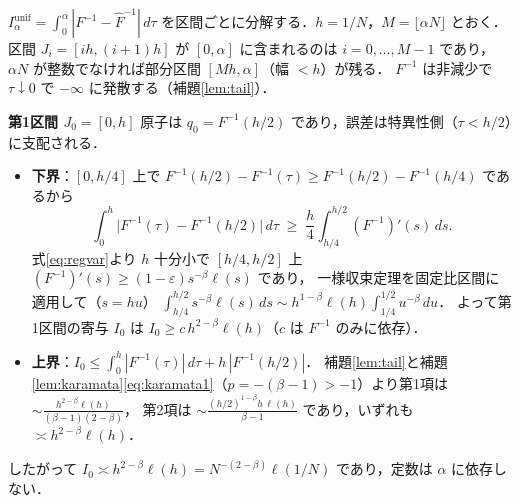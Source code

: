 \documentclass[a4paper,10pt]{jsarticle}
\makeatletter
\theoremstyle{definition}
\renewenvironment{proof}[1][\proofname]{\par
  \pushQED{\qed}%
  \normalfont \topsep6\p@\@plus6\p@\relax
  \trivlist
  \item[\hskip\labelsep\textbf{#1}]\ignorespaces
}{%
  \popQED\endtrivlist\@endpefalse
}
\renewcommand{\proofname}{証明}
\newcommand{\Finv}{F^{-1}}
\newcommand{\Fhinv}{\hat{F}^{-1}}
\newcommand{\Iunif}{I_\alpha^{\mathrm{unif}}}
\makeatother
\begin{document}
\begin{proof}
$\Iunif=\int_0^\alpha|\Finv-\Fhinv|\,d\tau$ を区間ごとに分解する．$h=1/N$，$M=\lfloor\alpha N\rfloor$ とおく．
区間 $J_i=[ih,(i+1)h]$ が $[0,\alpha]$ に含まれるのは $i=0,\dots,M-1$ であり，$\alpha N$ が整数でなければ部分区間 $[Mh,\alpha]$（幅 $<h$）が残る．
$\Finv$ は非減少で $\tau\downarrow0$ で $-\infty$ に発散する（補題\ref{lem:tail}）．

\noindent\textbf{第1区間 $J_0=[0,h]$}
原子は $q_0=\Finv(h/2)$ であり，誤差は特異性側（$\tau<h/2$）に支配される．
\begin{itemize}
\item \textbf{下界}：$[0,h/4]$ 上で $\Finv(h/2)-\Finv(\tau)\ge\Finv(h/2)-\Finv(h/4)$ であるから
\begin{equation*}
\int_0^{h}\bigl|\Finv(\tau)-\Finv(h/2)\bigr|\,d\tau
\;\ge\;\frac{h}{4}\int_{h/4}^{h/2}(\Finv)'(s)\,ds .
\end{equation*}
式\eqref{eq:regvar}より $h$ 十分小で $[h/4,h/2]$ 上 $(\Finv)'(s)\ge(1-\varepsilon)s^{-\beta}\ell(s)$ であり，
一様収束定理を固定比区間に適用して（$s=hu$）
$\int_{h/4}^{h/2}s^{-\beta}\ell(s)\,ds\sim h^{1-\beta}\ell(h)\int_{1/4}^{1/2}u^{-\beta}\,du$．
よって第1区間の寄与 $I_0$ は $I_0\ge c\,h^{2-\beta}\ell(h)$（$c$ は $\Finv$ のみに依存）．
\item \textbf{上界}：$I_0\le\int_0^h|\Finv(\tau)|\,d\tau+h\,|\Finv(h/2)|$．
補題\ref{lem:tail}と補題\ref{lem:karamata}\eqref{eq:karamata1}（$p=-(\beta-1)>-1$）より第1項は $\sim\frac{h^{2-\beta}\ell(h)}{(\beta-1)(2-\beta)}$，
第2項は $\sim\frac{(h/2)^{1-\beta}h\,\ell(h)}{\beta-1}$ であり，いずれも $\asymp h^{2-\beta}\ell(h)$．
\end{itemize}
したがって $I_0\asymp h^{2-\beta}\ell(h)=N^{-(2-\beta)}\ell(1/N)$ であり，定数は $\alpha$ に依存しない．


\end{proof}
\end{document}
